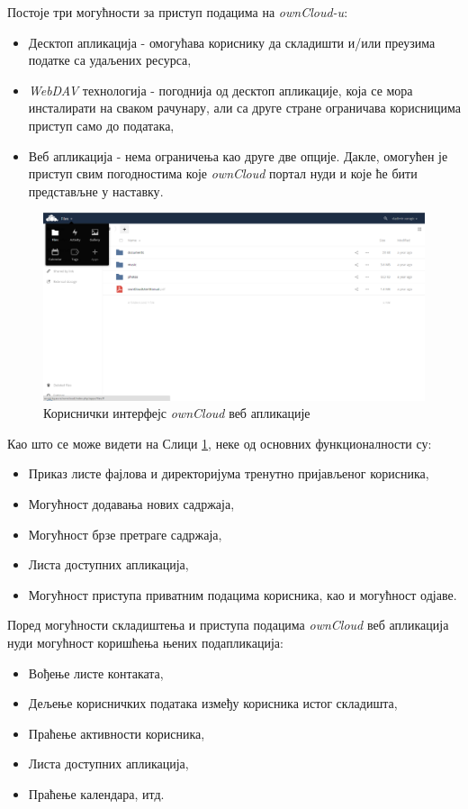 Постоје три могућности за приступ подацима на \textit{ownCloud-u}:
\begin{itemize}
	\item{Десктоп апликација - омогућава кориснику да складишти и/или преузима податке са удаљених ресурса},
	\item{\textit{WebDAV} технологија - погоднија од десктоп апликације, која се мора инсталирати на сваком рачунару, али са друге стране ограничава корисницима приступ само до података},
	\item{Веб апликација - нема ограничења као друге две опције. Дакле, омогућен је приступ свим погодностима које \textit{ownCloud} портал нуди и које ће бити представљне у наставку}.
\end{itemize}

\begin{figure}[H]
	\centering
	\includegraphics[scale=0.4]{slike/owncloud_ui_1.png}
	\caption{Кориснички интерфејс \textit{ownCloud} веб апликације}
	\label{fig:owncloud_ui_1}
\end{figure}

Као што се може видети на Слици \ref{fig:owncloud_ui_1}, неке од основних функционалности су:
\begin{itemize}
	\item Приказ листе фајлова и директоријума тренутно пријављеног корисника,
	\item Могућност додавања нових садржаја,
	\item Могућност брзе претраге садржаја,
	\item Листа доступних апликација,
	\item Могућност приступа приватним подацима корисника, као и могућност одјаве.
\end{itemize}

Поред могућности складиштења и приступа подацима \textit{ownCloud} веб апликација нуди могућност коришћења њених подапликација:
\begin{itemize}
	\item Вођење листе контаката,
	\item Дељење корисничких података између корисника истог складишта,
	\item Праћење активности корисника,
	\item Листа доступних апликација,
	\item Праћење календара, итд.
\end{itemize}

